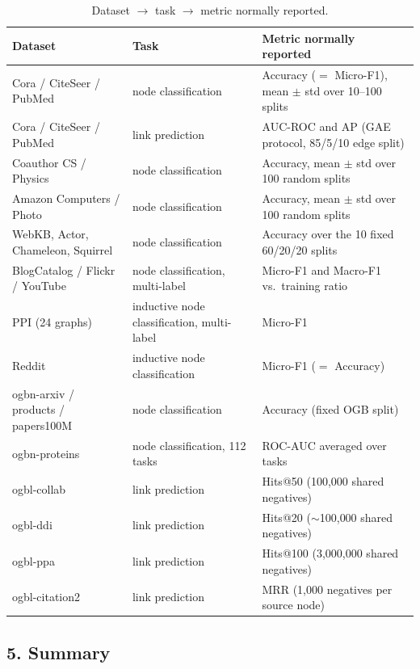 \begin{table}[H]
\centering
\small
\caption{Dataset $\rightarrow$ task $\rightarrow$ metric normally reported.}
\label{p1:tab:metrics}
\setlength{\tabcolsep}{4pt}
\begin{tabular}{@{}>{\raggedright\arraybackslash}p{4.1cm}
                  >{\raggedright\arraybackslash}p{3.6cm}
                  >{\raggedright\arraybackslash}p{6.9cm}@{}}
\toprule
Dataset & Task & Metric normally reported \\
\midrule
Cora / CiteSeer / PubMed & node classification & Accuracy ($=$ Micro-F1), mean $\pm$ std over 10--100 splits \\
Cora / CiteSeer / PubMed & link prediction     & AUC-ROC and AP (GAE protocol, 85/5/10 edge split) \\
Coauthor CS / Physics    & node classification & Accuracy, mean $\pm$ std over 100 random splits \\
Amazon Computers / Photo & node classification & Accuracy, mean $\pm$ std over 100 random splits \\
WebKB, Actor, Chameleon, Squirrel & node classification & Accuracy over the 10 fixed 60/20/20 splits \\
BlogCatalog / Flickr / YouTube & node classification, multi-label & Micro-F1 and Macro-F1 vs.\ training ratio \\
PPI (24 graphs) & inductive node classification, multi-label & Micro-F1 \\
Reddit & inductive node classification & Micro-F1 ($=$ Accuracy) \\
ogbn-arxiv / products / papers100M & node classification & Accuracy (fixed OGB split) \\
ogbn-proteins & node classification, 112 tasks & ROC-AUC averaged over tasks \\
ogbl-collab & link prediction & Hits@50 (100{,}000 shared negatives) \\
ogbl-ddi & link prediction & Hits@20 ($\sim$100{,}000 shared negatives) \\
ogbl-ppa & link prediction & Hits@100 (3{,}000{,}000 shared negatives) \\
ogbl-citation2 & link prediction & MRR (1{,}000 negatives per source node) \\
\bottomrule
\end{tabular}
\end{table}

\subsection*{5. Summary}

